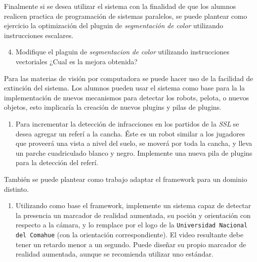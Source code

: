 Finalmente si se desea utilizar el sistema con la finalidad de que los alumnos
realicen practica de programación de sistemas paralelos, se puede plantear como
ejercicio la optimización del pluguin de \emph{segmentación de color} utilizando
instrucciones escalares.

\begin{enumerate}

	\setcounter{enumi}{3}

	\item{Modifique el plaguin de \emph{segmentacion de color} utilizando
	instrucciones vectoriales ¿Cual es la mejora obtenida?}

\end{enumerate}

Para las materias de visión por computadora se puede hacer uso de la facilidad
de extinción del sistema. Los alumnos pueden usar el sistema como base para la
la implementación de nuevos mecanismos para detectar los robots, pelota, o
nuevos objetos, esto implicaría la creación de nuevos plugins y pilas de
plugins.

\begin{enumerate}

	\item{Para incrementar la detección de infracciones en los partidos de
		la \emph{SSL} se desea agregar un referí a la cancha. Éste es un
		robot similar a los jugadores que proveerá una vista a nivel del
		suelo, se moverá por toda la cancha, y lleva un parche
		cuadriculado blanco y negro. Implemente una nueva pila de
		plugins para la detección del referí.}

\end{enumerate}

También se puede plantear como trabajo adaptar el framework para un dominio
distinto.

\begin{enumerate}

	\item{Utilizando como base el framework, implemente un sistema capaz de
		detectar la presencia un marcador de realidad aumentada, su
		poción y orientación con respecto a la cámara, y lo remplace por
		el logo de la \texttt{Universidad Nacional del Comahue} (con la
		orientación correspondiente). El video resultante debe tener un
		retardo menor a un segundo. Puede diseñar su propio marcador de
		realidad aumentada, aunque se recomienda utilizar uno estándar.}

\end{enumerate}
